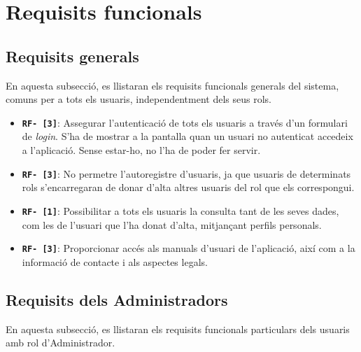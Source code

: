 \documentclass[a4paper,12pt]{ThesisStyle}
\begin{document}
\section{Requisits funcionals}
\label{sec:requisits_funcionals}

\subsection{Requisits generals}
\label{subsec:requisits_generals} %

En aquesta subsecció, es llistaran els requisits funcionals generals del sistema, comuns per a tots els usuaris, independentment dels seus rols.

\begin{itemize}
  \item \texttt{\textbf{RF- [3]}}: Assegurar l'autenticació de tots els usuaris a través d'un formulari de \emph{login}. S'ha de mostrar a la pantalla quan un usuari no autenticat accedeix a l'aplicació. Sense estar-ho, no l'ha de poder fer servir.
  \item \texttt{\textbf{RF- [3]}}: No permetre l'autoregistre d'usuaris, ja que usuaris de determinats rols s'encarregaran de donar d'alta altres usuaris del rol que els correspongui.
  \item \texttt{\textbf{RF- [1]}}: Possibilitar a tots els usuaris la consulta tant de les seves dades, com les de l'usuari que l'ha donat d'alta, mitjançant perfils personals.
  \item \texttt{\textbf{RF- [3]}}: Proporcionar accés als manuals d'usuari de l'aplicació, així com a la informació de contacte i als aspectes legals.
\end{itemize}

\subsection{Requisits dels Administradors}
\label{subsec:requisits_administradors}

En aquesta subsecció, es llistaran els requisits funcionals particulars dels usuaris amb rol d'Administrador.
\end{document}
